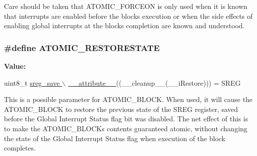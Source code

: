 Care should be taken that A\+T\+O\+M\+I\+C\+\_\+\+F\+O\+R\+C\+E\+ON is only used when it is known that interrupts are enabled before the block\textquotesingle{}s execution or when the side effects of enabling global interrupts at the block\textquotesingle{}s completion are known and understood. 
\subsubsection[{\texorpdfstring{A\+T\+O\+M\+I\+C\+\_\+\+R\+E\+S\+T\+O\+R\+E\+S\+T\+A\+TE}{ATOMIC_RESTORESTATE}}]{\setlength{\rightskip}{0pt plus 5cm}\#define A\+T\+O\+M\+I\+C\+\_\+\+R\+E\+S\+T\+O\+R\+E\+S\+T\+A\+TE}\hypertarget{group__util__atomic_ga362c18b15a09703e42e1c246c47420ef}{}\label{group__util__atomic_ga362c18b15a09703e42e1c246c47420ef}
{\bfseries Value\+:}
\begin{DoxyCode}
uint8\_t \hyperlink{stdint_8h_a772744ca0816d59e120b8f8a1ede64f0}{sreg\_save \(\backslash\)}
\hyperlink{stdint_8h_a772744ca0816d59e120b8f8a1ede64f0}{    \_\_attribute\_\_}((\_\_cleanup\_\_(\_\_iRestore))) = SREG
\end{DoxyCode}
This is a possible parameter for A\+T\+O\+M\+I\+C\+\_\+\+B\+L\+O\+CK. When used, it will cause the A\+T\+O\+M\+I\+C\+\_\+\+B\+L\+O\+CK to restore the previous state of the S\+R\+EG register, saved before the Global Interrupt Status flag bit was disabled. The net effect of this is to make the A\+T\+O\+M\+I\+C\+\_\+\+B\+L\+O\+CK\textquotesingle{}s contents guaranteed atomic, without changing the state of the Global Interrupt Status flag when execution of the block completes. 
